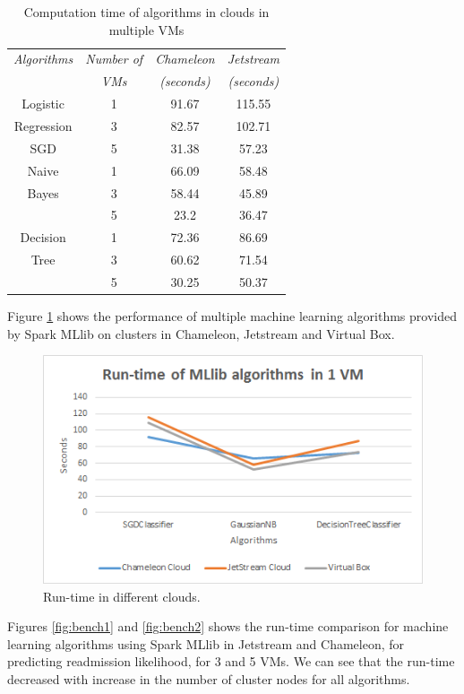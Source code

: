\documentclass[9pt,twocolumn,twoside]{styles/osajnl}
\begin{document}
\begin{table}[h!]
\centering
\caption{Computation time of algorithms in clouds in multiple VMs}
 \begin{tabular}{|c|c|c c|} 
 \hline
\textit{Algorithms} & \textit{Number of}  & \textit{Chameleon} & \textit{Jetstream}\\
& \textit{VMs} & \textit{(seconds)} & \textit{(seconds)}\\
 \hline
 \hline 
Logistic   & 1 & 91.67 & 115.55\\
Regression & 3 & 82.57 & 102.71\\
SGD & 5 & 31.38 & 57.23\\
\hline 
Naive  & 1 & 66.09 & 58.48\\
Bayes & 3 & 58.44 & 45.89\\
& 5 & 23.2 & 36.47\\
\hline
Decision & 1 & 72.36 & 86.69\\
Tree & 3 & 60.62 & 71.54\\
& 5 & 30.25 & 50.37\\
\hline
\end{tabular}
\label{table:bench}
\end{table}

Figure \ref{fig:bench} shows the performance of multiple machine learning algorithms provided by Spark MLlib on clusters in Chameleon, Jetstream and Virtual Box.
\begin{figure}[h!]
	\centering
	\includegraphics[width=\linewidth]{images/Benchmarking.png}
	\caption{Run-time in different clouds.}
	\label{fig:bench}
\end{figure}

Figures \ref{fig:bench1} and \ref{fig:bench2} shows the run-time comparison for machine learning algorithms using Spark MLlib in Jetstream and Chameleon, for predicting readmission likelihood, for 3 and 5 VMs. We can see that the run-time decreased with increase in the number of cluster nodes for all algorithms.
\end{document}
